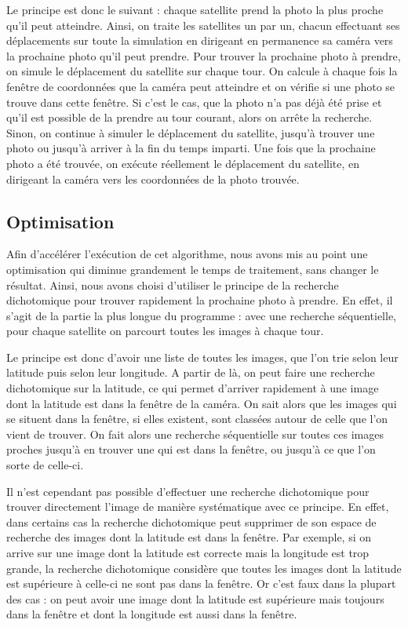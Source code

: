 \documentclass[11pt]{article}
\begin{document}
			Le principe est donc le suivant : chaque satellite prend la photo la plus proche qu'il peut atteindre. Ainsi, on traite les satellites un par un, chacun effectuant ses déplacements sur toute la simulation en dirigeant en permanence sa caméra vers la prochaine photo qu'il peut prendre. Pour trouver la prochaine photo à prendre, on simule le déplacement du satellite sur chaque tour. On calcule à chaque fois la fenêtre de coordonnées que la caméra peut atteindre et on vérifie si une photo se trouve dans cette fenêtre. Si c'est le cas, que la photo n'a pas déjà été prise et qu'il est possible de la prendre au tour courant, alors on arrête la recherche. Sinon, on continue à simuler le déplacement du satellite, jusqu'à trouver une photo ou jusqu'à arriver à la fin du temps imparti. Une fois que la prochaine photo a été trouvée, on exécute réellement le déplacement du satellite, en dirigeant la caméra vers les coordonnées de la photo trouvée.
		
		\subsection{Optimisation}
		
			Afin d'accélérer l'exécution de cet algorithme, nous avons mis au point une optimisation qui diminue grandement le temps de traitement, sans changer le résultat. Ainsi, nous avons choisi d'utiliser le principe de la recherche dichotomique pour trouver rapidement la prochaine photo à prendre. En effet, il s'agit de la partie la plus longue du programme : avec une recherche séquentielle, pour chaque satellite on parcourt toutes les images à chaque tour.
			
			Le principe est donc d'avoir une liste de toutes les images, que l'on trie selon leur latitude puis selon leur longitude. A partir de là, on peut faire une recherche dichotomique sur la latitude, ce qui permet d'arriver rapidement à une image dont la latitude est dans la fenêtre de la caméra. On sait alors que les images qui se situent dans la fenêtre, si elles existent, sont classées autour de celle que l'on vient de trouver. On fait alors une recherche séquentielle sur toutes ces images proches jusqu'à en trouver une qui est dans la fenêtre, ou jusqu'à ce que l'on sorte de celle-ci.
			
			Il n'est cependant pas possible d'effectuer une recherche dichotomique pour trouver directement l'image de manière systématique avec ce principe. En effet, dans certains cas la recherche dichotomique peut supprimer de son espace de recherche des images dont la latitude est dans la fenêtre. Par exemple, si on arrive sur une image dont la latitude est correcte mais la longitude est trop grande, la recherche dichotomique considère que toutes les images dont la latitude est supérieure à celle-ci ne sont pas dans la fenêtre. Or c'est faux dans la plupart des cas : on peut avoir une image dont la latitude est supérieure mais toujours dans la fenêtre et dont la longitude est aussi dans la fenêtre.
\end{document}
